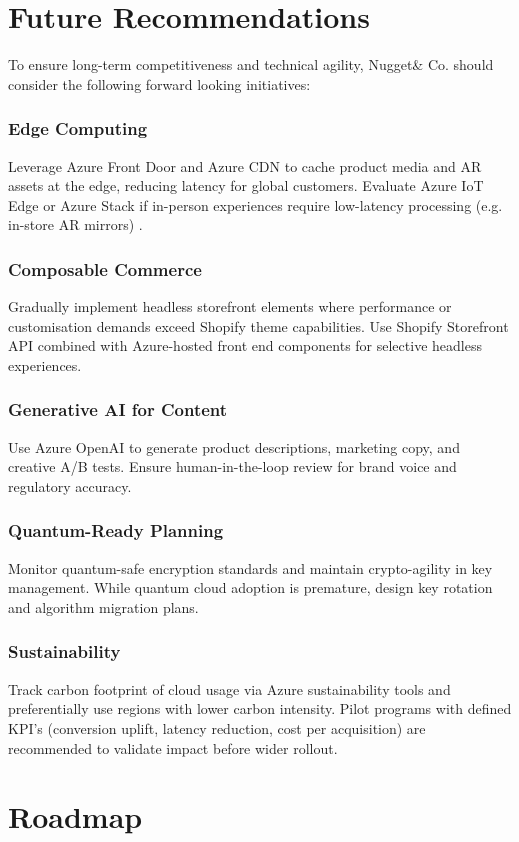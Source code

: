 \documentclass[12pt, a4paper, twoside]{article} %
\begin{document}
\section{Future Recommendations}

To ensure long-term competitiveness and technical agility, Nugget\& Co. should consider the following forward looking initiatives:
\subsubsection*{Edge Computing}
Leverage Azure Front Door and Azure CDN to cache product media and AR assets at the edge, reducing latency for global customers. Evaluate Azure IoT Edge or Azure Stack if in-person experiences require low-latency processing (e.g. in-store AR mirrors) \citep{borra2024a}.
\subsubsection*{Composable Commerce}
Gradually implement headless storefront elements where performance or customisation demands exceed Shopify theme capabilities. Use Shopify Storefront API combined with Azure-hosted front end components for selective headless experiences.
\subsubsection*{Generative AI for Content}
Use Azure OpenAI to generate product descriptions, marketing copy, and creative A/B tests. Ensure human-in-the-loop review for brand voice and regulatory accuracy.
\subsubsection*{Quantum-Ready Planning}
Monitor quantum-safe encryption standards and maintain crypto-agility in key management. While quantum cloud adoption is premature, design key rotation and algorithm migration plans.
\subsubsection*{Sustainability}
Track carbon footprint of cloud usage via Azure sustainability tools and preferentially use regions with lower carbon intensity. Pilot programs with defined KPI's (conversion uplift, latency reduction, cost per acquisition) are recommended to validate impact before wider rollout.

\section{Roadmap}
\end{document}
